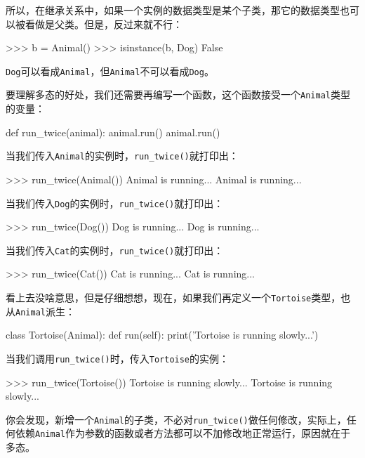 所以，在继承关系中，如果一个实例的数据类型是某个子类，那它的数据类型也可以被看做是父类。但是，反过来就不行：

\begin{pythoncode}
>>> b = Animal()
>>> isinstance(b, Dog)
False
\end{pythoncode}

\texttt{Dog}可以看成\texttt{Animal}，但\texttt{Animal}不可以看成\texttt{Dog}。

要理解多态的好处，我们还需要再编写一个函数，这个函数接受一个\texttt{Animal}类型的变量：

\begin{pythoncode}
def run_twice(animal):
    animal.run()
    animal.run()
\end{pythoncode}

当我们传入\texttt{Animal}的实例时，\texttt{run\_twice()}就打印出：

\begin{pythoncode}
>>> run_twice(Animal())
Animal is running...
Animal is running...
\end{pythoncode}

当我们传入\texttt{Dog}的实例时，\texttt{run\_twice()}就打印出：

\begin{pythoncode}
>>> run_twice(Dog())
Dog is running...
Dog is running...
\end{pythoncode}

当我们传入\texttt{Cat}的实例时，\texttt{run\_twice()}就打印出：

\begin{pythoncode}
>>> run_twice(Cat())
Cat is running...
Cat is running...
\end{pythoncode}

看上去没啥意思，但是仔细想想，现在，如果我们再定义一个\texttt{Tortoise}类型，也从\texttt{Animal}派生：

\begin{pythoncode}
class Tortoise(Animal):
    def run(self):
        print('Tortoise is running slowly...')
\end{pythoncode}

当我们调用\texttt{run\_twice()}时，传入\texttt{Tortoise}的实例：

\begin{pythoncode}
>>> run_twice(Tortoise())
Tortoise is running slowly...
Tortoise is running slowly...
\end{pythoncode}

你会发现，新增一个\texttt{Animal}的子类，不必对\texttt{run\_twice()}做任何修改，实际上，任何依赖\texttt{Animal}作为参数的函数或者方法都可以不加修改地正常运行，原因就在于多态。

